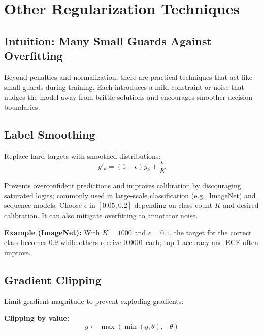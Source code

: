 
\section{Other Regularization Techniques }
\label{sec:other-regularization}

\subsection{Intuition: Many Small Guards Against Overfitting}

Beyond penalties and normalization, there are practical techniques that act like small guards during training. Each introduces a mild constraint or noise that nudges the model away from brittle solutions and encourages smoother decision boundaries.

\subsection{Label Smoothing}

Replace hard targets with smoothed distributions:
\begin{equation}
y'_k = (1 - \epsilon) y_k + \frac{\epsilon}{K}
\end{equation}

Prevents overconfident predictions and improves calibration by discouraging saturated logits; commonly used in large-scale classification (e.g., ImageNet) and sequence models. Choose $\epsilon$ in $[0.05, 0.2]$ depending on class count $K$ and desired calibration. It can also mitigate overfitting to annotator noise.

\begin{example}
\textbf{Example (ImageNet):} With $K=1000$ and $\epsilon=0.1$, the target for the correct class becomes $0.9$ while others receive $0.0001$ each; top-1 accuracy and ECE often improve.
\end{example}

\subsection{Gradient Clipping}

Limit gradient magnitude to prevent exploding gradients:

\textbf{Clipping by value:}
\begin{equation}
g \leftarrow \max(\min(g, \theta), -\theta)
\end{equation}


